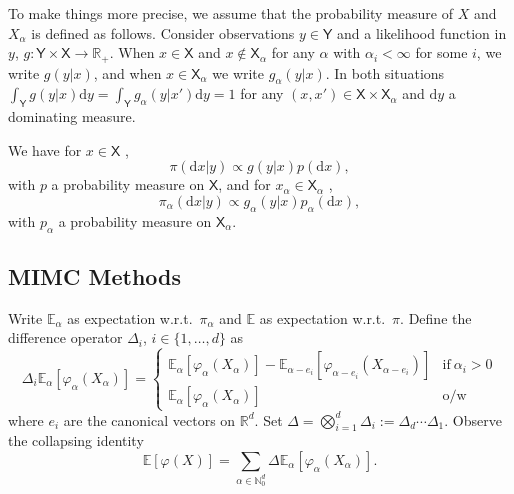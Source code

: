 \documentclass[english]{article}
\newcommand{\dif}{\mathrm{d}}
\begin{document}
To make things more precise, we assume that the probability measure of $X$ and $X_{\alpha}$
is defined as follows. Consider observations $y\in\mathsf{Y}$ and a likelihood function in $y$,
$g:\mathsf{Y}\times\mathsf{X}\rightarrow\mathbb{R}_+$.
When  $x\in\mathsf{X}$ and  $x \notin \mathsf{X}_{\alpha}$ for any $\alpha$ with $\alpha_i<\infty$ for some $i$, 
we write $g(y|x)$, and when $x\in\mathsf{X}_{\alpha}$ we write $g_{\alpha}(y|x)$. In both
situations $\int_{\mathsf{Y}}g(y|x)\dif y=\int_{\mathsf{Y}}g_{\alpha}(y|x')\dif y=1$ for any $(x,x')\in\mathsf{X}\times\mathsf{X}_{\alpha}$
and $\dif y$ a dominating measure.

We have for $x\in\mathsf{X}$ ,
$$
\pi(\dif x|y) \propto g(y|x) p(\dif x) ,
$$
with $p$ a probability measure on $\mathsf{X}$,
and for $x_{\alpha}\in\mathsf{X}_{\alpha}$ ,
$$
\pi_{\alpha}(\dif x|y) \propto g_{\alpha}(y|x) p_{\alpha}(\dif x) ,
$$
with $p_{\alpha}$ a probability measure on $\mathsf{X}_{\alpha}$.





\subsection{MIMC Methods}

Write $\mathbb{E}_{\alpha}$ as expectation w.r.t.~$\pi_{\alpha}$ 
and $\mathbb{E}$ as expectation w.r.t.~$\pi$.
Define the difference operator $\Delta_i$, $i\in\{1,\dots,d\}$ as
$$
\Delta_i \mathbb{E}_{\alpha}[\varphi_\alpha(X_{\alpha})]
= \left\{\begin{array}{ll}
\mathbb{E}_{\alpha}[\varphi_{\alpha}(X_{\alpha})]- \mathbb{E}_{\alpha-e_i}[\varphi_{\alpha-e_i}(X_{\alpha-e_i})]  & \textrm{if}~\alpha_i>0 \\
\mathbb{E}_{\alpha}[\varphi_{\alpha}(X_{\alpha})] & \textrm{o/w}
\end{array}\right.
$$
where $e_i$ are the canonical vectors on $\mathbb{R}^d$. 
Set $\Delta = \bigotimes_{i=1}^d \Delta_i := 
\Delta_d \cdots \Delta_1$.  %
Observe the collapsing identity
\begin{equation}\label{eq:collapse}
\mathbb{E}[\varphi(X)] = \sum_{\alpha\in \mathbb{N}_0^d}
\Delta \mathbb{E}_{\alpha}[\varphi_{\alpha}(X_{\alpha})].
\end{equation}
\end{document}
